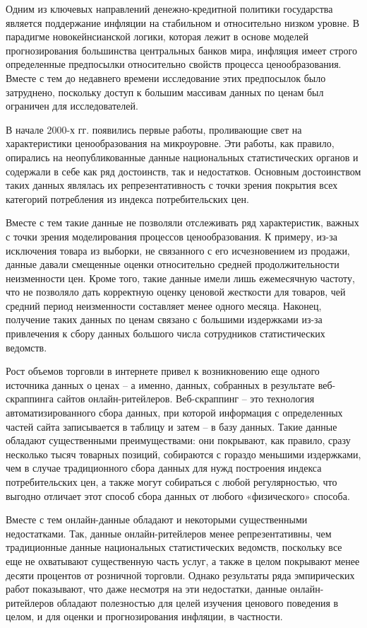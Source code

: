 
{\actuality} Одним из ключевых направлений денежно-кредитной политики государства является поддержание инфляции на стабильном и относительно низком уровне. В парадигме новокейнсианской логики, которая лежит в основе моделей прогнозирования большинства центральных банков мира, инфляция имеет строго определенные предпосылки относительно свойств процесса ценообразования. Вместе с тем до недавнего времени исследование этих предпосылок было затруднено, поскольку доступ к большим массивам данных по ценам был ограничен для исследователей.

В начале 2000-х гг. появились первые работы, проливающие свет на характеристики ценообразования на микроуровне. Эти работы, как правило, опирались на неопубликованные данные национальных статистических органов и содержали в себе как ряд достоинств, так и недостатков. Основным достоинством таких данных являлась их репрезентативность с точки зрения покрытия всех категорий потребления из индекса потребительских цен. 

Вместе с тем такие данные не позволяли отслеживать ряд характеристик, важных с точки зрения моделирования процессов ценообразования. К примеру, из-за исключения товара из выборки, не связанного с его исчезновением из продажи, данные давали смещенные оценки относительно средней продолжительности неизменности цен. Кроме того, такие данные имели лишь ежемесячную частоту, что не позволяло дать корректную оценку ценовой жесткости для товаров, чей средний период неизменности составляет менее одного месяца. Наконец, получение таких данных по ценам связано с большими издержками из-за привлечения к сбору данных большого числа сотрудников статистических ведомств.

Рост объемов торговли в интернете привел к возникновению еще одного источника данных о ценах – а именно, данных, собранных в результате веб-скраппинга сайтов онлайн-ритейлеров. Веб-скраппинг – это технология автоматизированного сбора данных, при которой информация с определенных частей сайта записывается в таблицу и затем – в базу данных. Такие данные обладают существенными преимуществами: они покрывают, как правило, сразу несколько тысяч товарных позиций, собираются с гораздо меньшими издержками, чем в случае традиционного сбора данных для нужд построения индекса потребительских цен, а также могут собираться с любой регулярностью, что выгодно отличает этот способ сбора данных от любого «физического» способа. 

Вместе с тем онлайн-данные обладают и некоторыми существенными недостатками. Так, данные онлайн-ритейлеров менее репрезентативны, чем традиционные данные национальных статистических ведомств, поскольку все еще не охватывают существенную часть услуг, а также в целом покрывают менее десяти процентов от розничной торговли. Однако результаты ряда эмпирических работ показывают, что даже несмотря на эти недостатки, данные онлайн-ритейлеров обладают полезностью для целей изучения ценового поведения в целом, и для оценки и прогнозирования инфляции, в частности.

